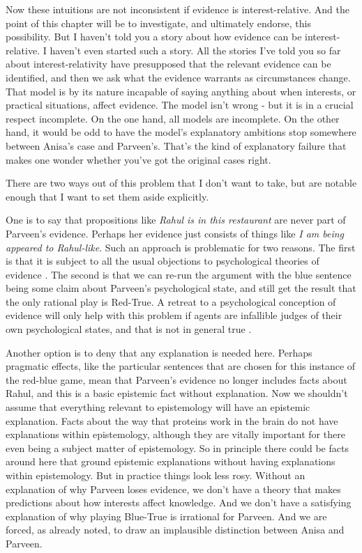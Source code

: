 \documentclass[11pt,]{book}
\begin{document}
Now these intuitions are not inconsistent if evidence is interest-relative. And the point of this chapter will be to investigate, and ultimately endorse, this possibility. But I haven't told you a story about how evidence can be interest-relative. I haven't even started such a story. All the stories I've told you so far about interest-relativity have presupposed that the relevant evidence can be identified, and then we ask what the evidence warrants as circumstances change. That model is by its nature incapable of saying anything about when interests, or practical situations, affect evidence. The model isn't wrong - but it is in a crucial respect incomplete. On the one hand, all models are incomplete. On the other hand, it would be odd to have the model's explanatory ambitions stop somewhere between Anisa's case and Parveen's. That's the kind of explanatory failure that makes one wonder whether you've got the original cases right.

There are two ways out of this problem that I don't want to take, but are notable enough that I want to set them aside explicitly.

One is to say that propositions like \emph{Rahul is in this restaurant} are never part of Parveen's evidence. Perhaps her evidence just consists of things like \emph{I am being appeared to Rahul-like}. Such an approach is problematic for two reasons. The first is that it is subject to all the usual objections to psychological theories of evidence \citep{Williamson2007}. The second is that we can re-run the argument with the blue sentence being some claim about Parveen's psychological state, and still get the result that the only rational play is Red-True. A retreat to a psychological conception of evidence will only help with this problem if agents are infallible judges of their own psychological states, and that is not in general true \citep{Schwitzgebel2008}.

Another option is to deny that any explanation is needed here. Perhaps pragmatic effects, like the particular sentences that are chosen for this instance of the red-blue game, mean that Parveen's evidence no longer includes facts about Rahul, and this is a basic epistemic fact without explanation. Now we shouldn't assume that everything relevant to epistemology will have an epistemic explanation. Facts about the way that proteins work in the brain do not have explanations within epistemology, although they are vitally important for there even being a subject matter of epistemology. So in principle there could be facts around here that ground epistemic explanations without having explanations within epistemology. But in practice things look less rosy. Without an explanation of why Parveen loses evidence, we don't have a theory that makes predictions about how interests affect knowledge. And we don't have a satisfying explanation of why playing Blue-True is irrational for Parveen. And we are forced, as already noted, to draw an implausible distinction between Anisa and Parveen.
\end{document}

